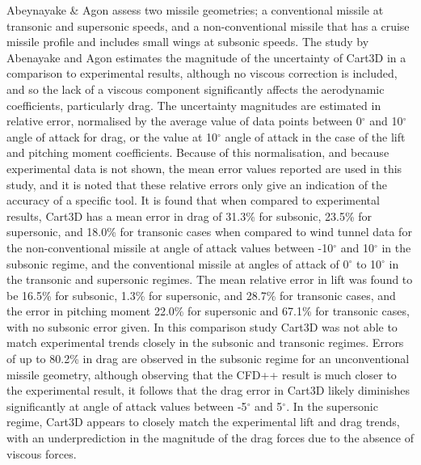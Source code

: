 
Abeynayake \& Agon assess two missile geometries; a conventional missile at transonic and supersonic speeds, and a non-conventional missile that has a cruise missile profile and includes small wings at subsonic speeds\cite{Abeynayake2013a}. The study by Abenayake and Agon estimates the magnitude of the uncertainty of Cart3D in a comparison to experimental results, although no viscous correction is included, and so the lack of a viscous component significantly affects the aerodynamic coefficients, particularly drag. The uncertainty magnitudes are estimated in relative error, normalised by the average value of data points between 0$^\circ$ and 10$^\circ$ angle of attack for drag, or the value at 10$^\circ$ angle of attack in the case of the lift and pitching moment coefficients\cite{Abeynayake2013a}. Because of this normalisation, and because experimental data is not shown\cite{Abeynayake2013a}, the mean error values reported are used in this study, and it is noted that these relative errors only give an indication of the accuracy of a specific tool\cite{Abeynayake2013a}. It is found that when compared to experimental results, Cart3D has a mean error in drag of 31.3\% for subsonic, 23.5\% for supersonic, and 18.0\% for transonic cases\cite{Abeynayake2013a} when compared to wind tunnel data for the non-conventional missile at angle of attack values between -10$^\circ$ and 10$^\circ$ in the subsonic regime, and the conventional missile at angles of attack of 0$^\circ$ to 10$^\circ$ in the transonic and supersonic regimes. The mean relative error in lift was found to be 16.5\% for subsonic, 1.3\% for supersonic, and 28.7\% for transonic cases\cite{Abeynayake2013a}, and the error in pitching moment 22.0\% for supersonic and 67.1\% for transonic cases, with no subsonic error given\cite{Abeynayake2013a}.
In this comparison study Cart3D was not able to match experimental trends closely in the subsonic and transonic regimes. Errors of up to 80.2\% in drag are observed in the subsonic regime for an unconventional missile geometry\cite{Abeynayake2013a}, although observing that the CFD++ result is much closer to the experimental result, it follows that the drag error in Cart3D likely diminishes significantly at angle of attack values between -5$^\circ$ and 5$^\circ$. In the supersonic regime, Cart3D appears to closely match the experimental lift and drag trends, with an underprediction in the magnitude of the drag forces due to the absence of viscous forces. 
